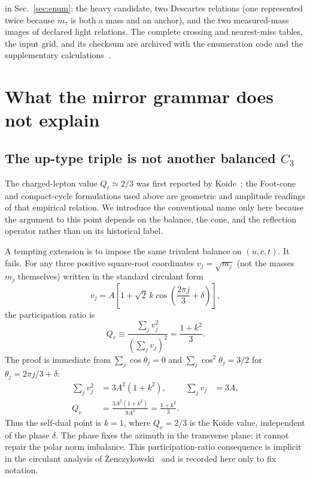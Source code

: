 \documentclass[aps,twocolumn,superscriptaddress,nofootinbib,floatfix]{revtex4-2}
\begin{document}
in Sec.~\ref{sec:enum}: the heavy candidate, two Descartes relations (one represented twice because $m_\tau$ is both a mass and an anchor), and the two measured-mass images of declared light relations. The complete crossing and nearest-miss tables, the input grid, and its checksum are archived with the enumeration code and the supplementary calculations~\cite{BrilliantGitHubEnum,BrilliantZenodoSupp}.

\section{What the mirror grammar does not explain}
\label{sec:failures}

\subsection{The up-type triple is not another balanced $C_3$}

The charged-lepton value $Q_\ell\simeq2/3$ was first reported by Koide~\cite{Koide1983}; the Foot-cone and compact-cycle formulations used above are geometric and amplitude readings of that empirical relation. We introduce the conventional name only here because the argument to this point depends on the balance, the cone, and the reflection operator rather than on its historical label.

A tempting extension is to impose the same trivalent balance on $(u,c,t)$. It fails. For any three positive square-root coordinates $v_j=\sqrt{m_j}$ (not the masses $m_j$ themselves) written in the standard circulant form~\cite{Koide1983,Zenczykowski2012}
\begin{equation}
v_j=A\left[1+\sqrt2\,k\cos\left(\frac{2\pi j}{3}+\delta\right)\right],
\end{equation}
the participation ratio is
\begin{equation}
Q_v\equiv\frac{\sum_jv_j^2}{(\sum_jv_j)^2}=\frac{1+k^2}{3}.
\label{eq:Qk}
\end{equation}
The proof is immediate from $\sum_j\cos\theta_j=0$ and $\sum_j\cos^2\theta_j=3/2$ for $\theta_j=2\pi j/3+\delta$:
\begin{align}
\sum_j v_j^2&=3A^2(1+k^2),
&
\sum_j v_j&=3A,
\nonumber\\
Q_v&=\frac{3A^2(1+k^2)}{9A^2}
=\frac{1+k^2}{3}.
\end{align}
Thus the self-dual point is $k=1$, where $Q_v=2/3$ is the Koide value, independent of the phase $\delta$. The phase fixes the azimuth in the transverse plane; it cannot repair the polar norm imbalance. This participation-ratio consequence is implicit in the circulant analysis of \.{Z}enczykowski~\cite{Zenczykowski2012} and is recorded here only to fix notation.
\end{document}
